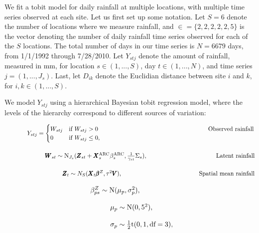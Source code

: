 \documentclass[12pt]{article}
\def\bbeta{\pmb{\beta}}
\def\bX{\pmb{X}}
\def\bZ{\pmb{Z}}
\def\bV{\pmb{V}}
\def\bW{\pmb{W}}
\begin{document}
We fit a tobit model for daily rainfall at multiple locations, with multiple time series observed at each site. Let us first set up some notation. Let $S=6$ denote the number of locations where we measure rainfall, and $\in = \{2,2,2,2,2,5\}$ is the vector denoting the number of daily rainfall time series observed for each of the $S$ locations. The total number of days in our time series is $N=6679$ days, from 1/1/1992 through 7/28/2010. Let $Y_{stj}$ denote the amount of rainfall, measured in mm, for location $s \in (1,...,S)$, day $t \in (1,...,N)$, and time series $j = (1,...,J_s)$. Last, let $D_{ik}$ denote the Euclidian distance between site $i$ and $k$, for $i,k \in (1,...,S)$.

We model $Y_{stj}$ using a hierarchical Bayesian tobit regression model, where the levels of the hierarchy correspond to different sources of variation:

$\hspace{0.5in}
Y_{stj} = \begin{cases} W_{stj} &\mbox{if } W_{stj} > 0 \hspace{2.5in} \text{Observed rainfall}\\
0  &\mbox{if } W_{stj} \leq 0, \end{cases}
$

$\hspace{0.9in}
\bW_{st} \sim \text{N}_{J_s}(\bZ_{st} + \bX^\text{ARC}_s \beta^\text{ARC}_s, \frac{1}{\gamma_{st}}\Sigma_s), \hspace{1.55in} \text{Latent rainfall}
$




$\hspace{1.3in}
\bZ_t \sim N_S(\bX_t \bbeta^Z, \tau^2\bV), \hspace{1.75in} \text{Spatial mean rainfall}
$

$\hspace{1.7in}
\beta_{ps}^Z \sim \text{N}(\mu_p, \sigma^2_p),
$

$\hspace{2.1in}
\mu_{p} \sim \text{N}(0, 5^2),
$

$\hspace{2.1in}
\sigma_{p} \sim \frac{1}{2}\text{t}(0, 1, \text{df} = 3),
$
\end{document}
